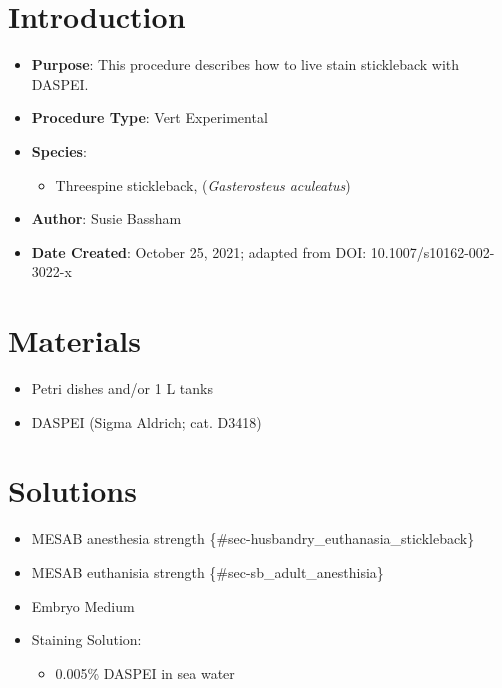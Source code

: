 \documentclass[
  letterpaper,
  DIV=11,
  numbers=noendperiod]{scrreprt}
\providecommand{\tightlist}{%
  \setlength{\itemsep}{0pt}\setlength{\parskip}{0pt}}\usepackage{longtable,booktabs,array}
\begin{document}
\hypertarget{introduction-55}{%
\section{Introduction}\label{introduction-55}}

\begin{itemize}
\tightlist
\item
  \textbf{Purpose}: This procedure describes how to live stain
  stickleback with DASPEI.
\item
  \textbf{Procedure Type}: Vert Experimental
\item
  \textbf{Species}:

  \begin{itemize}
  \tightlist
  \item
    Threespine stickleback, (\emph{Gasterosteus aculeatus})
  \end{itemize}
\item
  \textbf{Author}: Susie Bassham
\item
  \textbf{Date Created}: October 25, 2021; adapted from DOI:
  10.1007/s10162-002-3022-x
\end{itemize}

\hypertarget{materials-51}{%
\section{Materials}\label{materials-51}}

\begin{itemize}
\tightlist
\item
  Petri dishes and/or 1 L tanks
\item
  DASPEI (Sigma Aldrich; cat. D3418)
\end{itemize}

\hypertarget{solutions-48}{%
\section{Solutions}\label{solutions-48}}

\begin{itemize}
\tightlist
\item
  MESAB anesthesia strength \{\#sec-husbandry\_euthanasia\_stickleback\}
\item
  MESAB euthanisia strength \{\#sec-sb\_adult\_anesthisia\}
\item
  Embryo Medium\\
\item
  Staining Solution:

  \begin{itemize}
  \tightlist
  \item
    0.005\% DASPEI in sea water
  \end{itemize}
\end{itemize}
\end{document}
